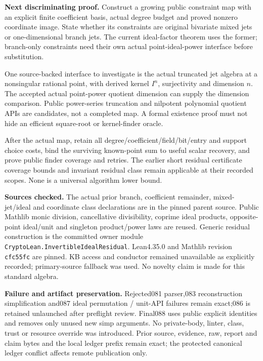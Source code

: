 \documentclass[11pt]{article}
\begin{document}
\textbf{Next discriminating proof.}
Construct a growing public constraint map with an explicit finite coefficient
basis, actual degree budget and proved nonzero coordinate image. State whether
its constraints are original bivariate mixed jets or one-dimensional branch
jets. The current ideal-factor theorem uses the former; branch-only constraints
need their own actual point-ideal-power interface before substitution.

One source-backed interface to investigate is the actual truncated jet algebra
at a nonsingular rational point, with derived kernel \(I^n\), surjectivity and
dimension \(n\). The accepted actual point-power quotient dimension can supply
the dimension comparison. Public power-series truncation and nilpotent
polynomial quotient APIs are candidates, not a completed map. A formal
existence proof must not hide an efficient square-root or kernel-finder oracle.

After the actual map, retain all degree/coefficient/field/bit/entry and support
choice costs, bind the surviving known-point sum to useful scalar recovery,
and prove public finder coverage and retries. The earlier short residual
certificate coverage bounds and invariant residual class remain applicable at
their recorded scopes. None is a universal algorithm lower bound.

\textbf{Sources checked.}
The actual prior branch, coefficient remainder, mixed-jet/ideal and coordinate
class declarations are in the pinned parent source. Public Mathlib monic
division, cancellative divisibility, coprime ideal products, opposite-point
ideal/unit and singleton product/power laws are reused. Generic residual
construction is the committed owner module
\texttt{CryptoLean.InvertibleIdealResidual}.
Lean4.35.0 and Mathlib revision \texttt{cfc55fc} are pinned. KB access and
conductor remained unavailable as explicitly recorded; primary-source fallback
was used. No novelty claim is made for this standard algebra.

\textbf{Failure and artifact preservation.}
Rejected081 parser,083 reconstruction simplification and087 ideal permutation /
unit-API failures remain exact;086 is retained unlaunched after preflight
review. Final088 uses public explicit identities and removes only unused new
simp arguments. No private-body, linter, class, trust or resource override was
introduced. Prior source, evidence, raw, report and claim bytes and the local
ledger prefix remain exact; the protected canonical ledger conflict affects
remote publication only.
\end{document}
